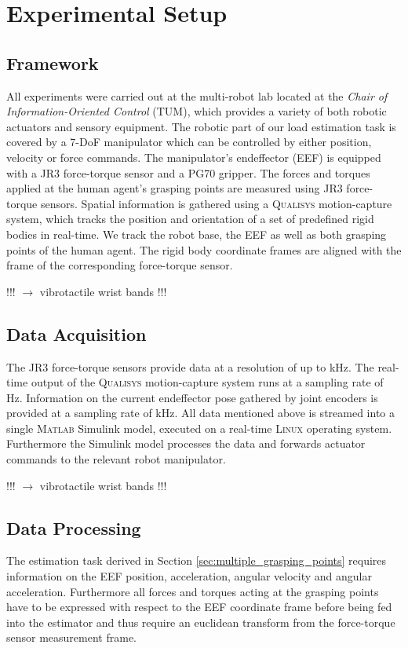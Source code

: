 \section{Experimental Setup}
\subsection{Framework}
All experiments were carried out at the multi-robot lab located at the \textit{Chair of Information-Oriented Control} (TUM), which provides a variety of both robotic actuators and sensory equipment. The robotic part of our load estimation task is covered by a 7-DoF manipulator which can be controlled by either position, velocity or force commands. The manipulator's endeffector (EEF) is equipped with a \textsc{JR3} force-torque sensor and a \textsc{PG70} gripper. The forces and torques applied at the human agent's grasping points are measured using \textsc{JR3} force-torque sensors. Spatial information is gathered using a \textsc{Qualisys} motion-capture system, which tracks the position and orientation of a set of predefined rigid bodies in real-time. We track the robot base, the EEF as well as both grasping points of the human agent. The rigid body coordinate frames are aligned with the frame of the corresponding force-torque sensor.

!!! $\longrightarrow$ vibrotactile wrist bands !!!
\subsection{Data Acquisition}
The \textsc{JR3} force-torque sensors provide data at a resolution of up to \unit[8]{kHz}. The real-time output of the \textsc{Qualisys} motion-capture system runs at a sampling rate of \unit[150]{Hz}. Information on the current endeffector pose gathered by joint encoders is provided at a sampling rate of \unit[1]{kHz}. All data mentioned above is streamed into a single \textsc{Matlab} Simulink model, executed on a real-time \textsc{Linux} operating system. Furthermore the Simulink model processes the data and forwards actuator commands to the relevant robot manipulator.

!!! $\longrightarrow$ vibrotactile wrist bands !!!

\subsection{Data Processing}
The estimation task derived in Section \ref{sec:multiple_grasping_points} requires information on the EEF position, acceleration, angular velocity and angular acceleration. Furthermore all forces and torques acting at the grasping points have to be expressed with respect to the EEF coordinate frame before being fed into the estimator and thus require an euclidean transform from the force-torque sensor measurement frame.

